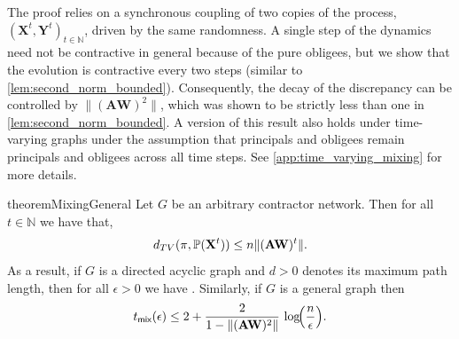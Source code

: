 \documentclass[mnsc,nonblindrev]{informs3}
\newcommand{\NN}{\mathbb{N}}
\renewcommand{\Pr}{\mathbb{P}}
\newcommand{\Xvec}{\mathbf{X}}
\newcommand{\Yvec}{\mathbf{Y}}
\newcommand{\A}{\mathbf{A}}
\newcommand{\W}{\mathbf{W}}
\newcommand{\tmix}{t_{\textsf{mix}}}
\DeclarePairedDelimiter{\norm}{\lVert}{\rVert}
\let\originalleft\left
\let\originalright\right
\renewcommand{\left}{\mathopen{}\mathclose\bgroup\originalleft}
\renewcommand{\right}{\aftergroup\egroup\originalright}
\begin{document}
 The proof relies on a synchronous coupling of two copies of the process, $(\Xvec^{t},\Yvec^{t})_{t \in \NN}$, driven by the same randomness. A single step of the dynamics need not be contractive in general because of the pure obligees, but we show that the evolution is contractive every two steps (similar to \cref{lem:second_norm_bounded}). Consequently, the decay of the discrepancy can be controlled by $\|(\A\W)^2\|$, which was shown to be strictly less than one in \cref{lem:second_norm_bounded}.  A version of this result also holds under time-varying graphs under the assumption that principals and obligees remain principals and obligees across all time steps.  See \cref{app:time_varying_mixing} for more details.

\begin{restatable}{theorem}{MixingGeneral}
\label{thm:mixing_time}
Let $G$ be an arbitrary contractor network.  Then for all $t \in \mathbb{N}$ we have that,
\begin{equation}
d_{TV}(\pi, \Pr(\Xvec^t)) \leq n \norm{(\A\W)^t}.
\end{equation}
As a result, if $G$ is a directed acyclic graph and \(d > 0\) denotes its maximum path length, then for all $\epsilon > 0$ we have \srsedit{$\tmix(\epsilon) \leq d+1$}.  Similarly, if $G$ is a general graph then
\begin{equation}
\label{eq:tmix_bound}
\tmix(\epsilon) \leq 2 + \frac{2}{1-\|(\A\W)^2\|}\,\log\!\left(\frac{n}{\epsilon}\right).
\end{equation}
\end{restatable}
\end{document}
